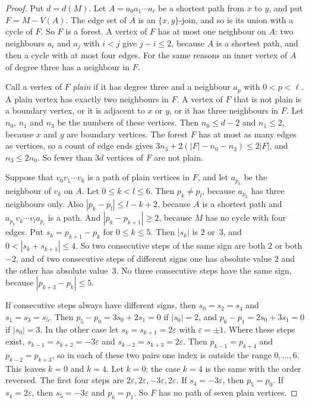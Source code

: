 \begin{proof}
Put $d=d(M)$. Let $A=a_0a_1\cdots a_\ell$ be a shortest path from $x$ to $y$, and put
$F=M-V(A)$. The edge set of $A$ is an $\{x,y\}$-join, and so is its union with a cycle of $F$. So
$F$ is a forest. A vertex of $F$ has at most one neighbour on $A$: two neighbours $a_i$ and
$a_j$ with $i<j$ give $j-i\le2$, because $A$ is a shortest path, and then a cycle with at most
four edges. For the same reasons an inner vertex of $A$ of degree three has a neighbour in $F$.

Call a vertex of $F$ \emph{plain} if it has degree three and a neighbour $a_p$ with $0<p<\ell$.
A plain vertex has exactly two neighbours in $F$. A vertex of $F$ that is not plain is a
boundary vertex, or it is adjacent to $x$ or $y$, or it has three neighbours in $F$. Let $n_0$,
$n_1$ and $n_3$ be the numbers of these vertices. Then $n_0\le d-2$ and $n_1\le2$, because $x$
and $y$ are boundary vertices. The forest $F$ has at most as many edges as vertices, so a count
of edge ends gives $3n_3+2(|F|-n_0-n_3)\le2|F|$, and $n_3\le2n_0$. So fewer than $3d$ vertices
of $F$ are not plain.

 Suppose that $v_0v_1\cdots v_6$ is a path of plain
vertices in $F$, and let $a_{p_k}$ be the neighbour of $v_k$ on $A$. Let $0\le k<l\le6$. Then
$p_k\ne p_l$, because $a_{p_k}$ has three neighbours only. Also $|p_k-p_l|\le l-k+2$, because
$A$ is a shortest path and $a_{p_k}v_k\cdots v_la_{p_l}$ is a path. And $|p_k-p_{k+1}|\ge2$,
because $M$ has no cycle with four edges. Put $s_k=p_{k+1}-p_k$ for $0\le k\le5$. Then $|s_k|$
is $2$ or~$3$, and $0<|s_k+s_{k+1}|\le4$. So two consecutive steps of the same sign are both
$2$ or both $-2$, and of two consecutive steps of different signs one has absolute value $2$
and the other has absolute value~$3$. No three consecutive steps have the same sign, because
$|p_{k+3}-p_k|\le5$.

If consecutive steps always have different signs, then $s_0=s_2=s_4$ and $s_1=s_3=s_5$. Then
$p_5-p_0=3s_0+2s_1=0$ if $|s_0|=2$, and $p_6-p_1=2s_0+3s_1=0$ if $|s_0|=3$. In the other case
let $s_k=s_{k+1}=2\varepsilon$ with $\varepsilon=\pm1$. Where these steps exist,
$s_{k-1}=s_{k+2}=-3\varepsilon$ and $s_{k-2}=s_{k+3}=2\varepsilon$. Then $p_{k-1}=p_{k+4}$ and
$p_{k-2}=p_{k+3}$, so in each of these two pairs one index is outside the range $0,\dots,6$.
This leaves $k=0$ and $k=4$. Let $k=0$; the case $k=4$ is the same with the order reversed. The
first four steps are $2\varepsilon,2\varepsilon,-3\varepsilon,2\varepsilon$. If
$s_4=-3\varepsilon$, then $p_5=p_0$. If $s_4=2\varepsilon$, then $s_5=-3\varepsilon$ and
$p_6=p_1$. So $F$ has no path of seven plain vertices.


\end{proof}
